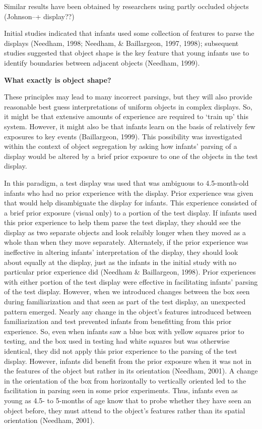 Similar results have been obtained by researchers using partly
occluded objects (Johnson--+ display??)


Initial studies indicated that infants used some collection of
features to parse the displays (Needham, 1998; Needham, \& Baillargeon,
1997, 1998); subsequent studies suggested that object shape is the key
feature that young infants use to identify boundaries between adjacent
objects (Needham, 1999).

{
\bf What exactly is object shape?
}


These principles may lead to many incorrect parsings, but they will
also provide reasonable best guess interpretations of uniform objects
in complex displays.  So, it might be that extensive amounts of
experience are required to `train up' this system.
However, it might also be that infants learn on the basis of
relatively few exposures to key events (Baillargeon, 1999).  This
possibility was investigated within the context of object segregation
by asking how infants' parsing of a display would be altered
by a brief prior exposure to one of the objects in the test display.


In this paradigm, a test display was used that was ambiguous to
4.5-month-old infants who had no prior experience with the display.
Prior experience was given that would help disambiguate the display
for infants.  This experience consisted of a brief prior exposure
(visual only) to a portion of the test display.  If infants used this
prior experience to help them parse the test display, they should see
the display as two separate objects and look relaibly longer when they
moved as a whole than when they move separately.  Alternately, if the
prior experience was ineffective in altering infants'
interpretation of the display, they should look about equally at the
display, just as the infants in the initial study with no particular
prior experience did (Needham \& Baillargeon, 1998).  Prior experiences
with either portion of the test display were effective in facilitating
infants' parsing of the test display.  However, when we
introduced changes between the box seen during familiarization and
that seen as part of the test display, an unexpected pattern emerged.
Nearly any change in the object's features introduced between
familiarization and test prevented infants from benefitting from this
prior experience.  So, even when infants saw a blue box with yellow
squares prior to testing, and the box used in testing had white
squares but was otherwise identical, they did not apply this prior
experience to the parsing of the test display.  However, infants did
benefit from the prior exposure when it was not in the features of the
object but rather in its orientation (Needham, 2001).  A change in the
orientation of the box from horizontally to vertically oriented led to
the facilitation in parsing seen in some prior experiments.  Thus,
infants even as young as 4.5- to 5-months of age know that to probe
whether they have seen an object before, they must attend to the
object's features rather than its spatial orientation
(Needham, 2001).

